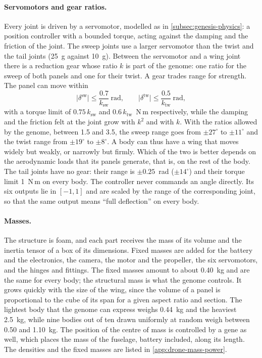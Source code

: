 \paragraph{Servomotors and gear ratios.} Every joint is driven by a servomotor, modelled as in \autoref{subsec:genesis-physics}: a position controller with a bounded torque, acting against the damping and the friction of the joint. The sweep joints use a larger servomotor than the twist and the tail joints (25~g against 10~g). Between the servomotor and a wing joint there is a reduction gear whose ratio $k$ is part of the genome: one ratio for the sweep of both panels and one for their twist. A gear trades range for strength. The panel can move within
\begin{equation}
\lvert \delta^{\mathrm{sw}} \rvert \le \frac{0.7}{k_{\mathrm{sw}}}~\text{rad}, \qquad \lvert \delta^{\mathrm{tw}} \rvert \le \frac{0.5}{k_{\mathrm{tw}}}~\text{rad},
\label{eq:drone-gear}
\end{equation}
with a torque limit of $0.75\, k_{\mathrm{sw}}$ and $0.6\, k_{\mathrm{tw}}$~N\,m respectively, while the damping and the friction felt at the joint grow with $k^2$ and with $k$. With the ratios allowed by the genome, between 1.5 and 3.5, the sweep range goes from $\pm 27^{\circ}$ to $\pm 11^{\circ}$ and the twist range from $\pm 19^{\circ}$ to $\pm 8^{\circ}$. A body can thus have a wing that moves widely but weakly, or narrowly but firmly. Which of the two is better depends on the aerodynamic loads that its panels generate, that is, on the rest of the body. The tail joints have no gear: their range is $\pm 0.25$~rad ($\pm 14^{\circ}$) and their torque limit 1~N\,m on every body. The controller never commands an angle directly. Its six outputs lie in $[-1, 1]$ and are scaled by the range of the corresponding joint, so that the same output means ``full deflection'' on every body.

\paragraph{Masses.} The structure is foam, and each part receives the mass of its volume and the inertia tensor of a box of its dimensions. Fixed masses are added for the battery and the electronics, the camera, the motor and the propeller, the six servomotors, and the hinges and fittings. The fixed masses amount to about 0.40~kg and are the same for every body; the structural mass is what the genome controls. It grows quickly with the size of the wing, since the volume of a panel is proportional to the cube of its span for a given aspect ratio and section. The lightest body that the genome can express weighs 0.44~kg and the heaviest 2.5~kg, while nine bodies out of ten drawn uniformly at random weigh between 0.50 and 1.10~kg. The position of the centre of mass is controlled by a gene as well, which places the mass of the fuselage, battery included, along its length. The densities and the fixed masses are listed in \autoref{app:drone-mass-power}.

